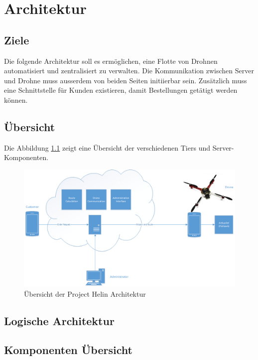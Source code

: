 \chapter{Architektur}

\section{Ziele}

Die folgende Architektur soll es ermöglichen, eine Flotte von Drohnen automatisiert und zentralisiert zu verwalten. Die Kommunikation zwischen Server und Drohne muss ausserdem von beiden Seiten initiierbar sein. Zusätzlich muss eine Schnittstelle für Kunden existieren, damit Bestellungen getätigt werden können. 

\section{Übersicht}

Die Abbildung \ref{fig:architecture-overview} zeigt eine Übersicht der verschiedenen Tiers und Server-Komponenten.

\begin{figure}[h]
	\includegraphics[width=1.0\textwidth]{images/Overview-Diagram.png}
	\caption{Übersicht der Project Helin Architektur }
	\label{fig:architecture-overview}
\end{figure}

\section{Logische Architektur}

\section{Komponenten Übersicht}

